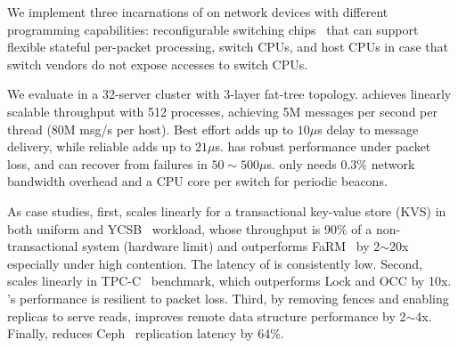We implement three incarnations of \sys on network devices with different programming capabilities: reconfigurable switching chips~\cite{tofino,cavium} that can support flexible stateful per-packet processing, switch CPUs, and host CPUs in case that switch vendors do not expose accesses to switch CPUs.



We evaluate \sys in a 32-server cluster with 3-layer fat-tree topology.
\sys{} achieves linearly scalable throughput with 512 processes, achieving 5M messages per second per thread (80M msg/s per host).
Best effort \sys{} adds up to $10 \mu$s delay to message delivery, while reliable \sys{} adds up to $21 \mu$s.
\sys{} has robust performance under packet loss, and can recover from failures in $50 \sim 500 \mu$s.
\sys{} only needs 0.3\% network bandwidth overhead and a CPU core per switch for periodic beacons.

As case studies, first, \sys{} scales linearly for a transactional key-value store (KVS) in both uniform and YCSB~\cite{cooper2010benchmarking} workload, whose throughput is 90\% of a non-transactional system (hardware limit) and outperforms FaRM~\cite{dragojevic2014farm} by 2$\sim$20x especially under high contention.
The latency of \sys{} is consistently low.
Second, \sys{} scales linearly in TPC-C~\cite{tpcc} benchmark, which outperforms Lock and OCC by 10x. \sys{}'s performance is resilient to packet loss.
Third, by removing fences and enabling replicas to serve reads, \sys{} improves remote data structure performance by 2$\sim$4x.
Finally, \sys{} reduces Ceph~\cite{weil2006ceph} replication latency by 64\%.

